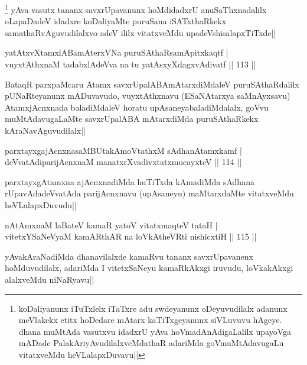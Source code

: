 \begin{artha}
\footnote[1]{koDaliyanunx iTuTxlelx iTaTxre adu swdeyanunx oDeyuvudilalx adanunx meVlakekx etitx hoDedare mAtarx kaTiTxgeyanunx siVLuvuvu hAgeye. dhana muMtAda vasutxvu idadxrU yAva hoVmadAnAdigaLalilx upayoVga mADade PalakAriyAvudilalxveMdathaR adariMda goVmuMtAdavugaLu vitatxveMdu heVLalapxDuvavu||} yAva vasutx tananx savxrUpavanunx hoMdidadxrU anuSaThxnadalilx oLapaDadeV idadxre koDaliyaMte puruSana iSATxthaRkekx samathaRvAguvudilalxvo adeV ililx vitatxveMdu upadeVshisalapxTiTxde||
\end{artha}


\begin{shl}
yatAtxvXtamxlABamAterxVNa puruSAthaRsamApitxkaqtf |\\
vuyxtAthxnaM tadabxlAdeVva na tu yatAsxyXdagxvAdivatf \hfill || 113 ||
\end{shl}

\begin{artha}
BataqR parxpaMcaru Atamx savxrUpalABAmAtarxdiMdaleV puruSAthaRdalilx pUNaRteyanunx mADuvavudo, vuyxtAthxnavu (ESaNAtarxya saMnAyxsavu) AtamxjAcnxnada baladiMdaleV horatu upAsaneyabaladiMdalalx, goVvu muMtAdavugaLaMte savxrUpalABA mAtarxdiMda puruSAthaRkekx kAraNavAguvudilalx|| 
\end{artha}%

\begin{shl}
parxtayxgajAcnxnasaMBUtakAmoVtathxM sAdhanAtamxkamf |\\
deVvatAdiparijAcnxnaM manatxrXvadivxtatxmucayxteV \hfill || 114 ||
\end{shl}

\begin{artha}
parxtayxgAtamxna ajAcnxnadiMda huTiTxda kAmadiMda sAdhana rUpavAdadeVvatAda parijAcnxnavu (upAsaneyu) maMtarxdaMte vitatxveMdu heVLalapxDuvudu||
\end{artha}

\begin{shl}
nA\s \s tAmxnaM laBateV kamaR yatoV vitatxmaqteV tataH |\\
vitetxYSaNeVyaM kamARthAR na loVkAtheVRti nishicxtiH \hfill || 115 ||
\end{shl}

\begin{artha}
yAvakAraNadiMda dhanavilalxde kamaRvu tananx savxrUpavanenx hoMduvudilalx, adariMda I vitetxSaNeyu kamaRkAkxgi iruvudu, loVkakAkxgi alalxveMdu niNaRyavu||
\end{artha}

